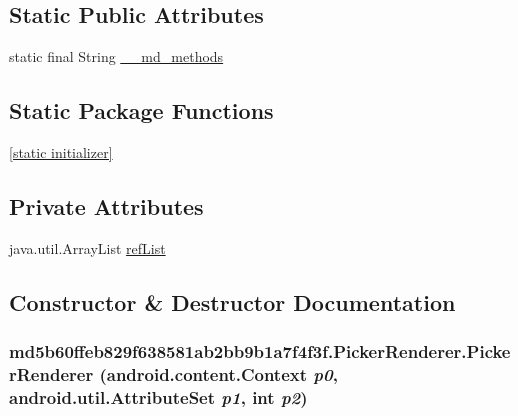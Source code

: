 \subsection*{Static Public Attributes}
\begin{CompactItemize}
\item 
static final String \hyperlink{classmd5b60ffeb829f638581ab2bb9b1a7f4f3f_1_1_picker_renderer_8a968a337192314e31ec4d605077182c}{\_\-\_\-md\_\-methods}
\end{CompactItemize}
\subsection*{Static Package Functions}
\begin{CompactItemize}
\item 
\hyperlink{classmd5b60ffeb829f638581ab2bb9b1a7f4f3f_1_1_picker_renderer_2225d8c4d5ee2120239beb2993665437}{\mbox{[}static initializer\mbox{]}}
\end{CompactItemize}
\subsection*{Private Attributes}
\begin{CompactItemize}
\item 
java.util.ArrayList \hyperlink{classmd5b60ffeb829f638581ab2bb9b1a7f4f3f_1_1_picker_renderer_7de5daff58c215b987daa2f1c47cdee5}{refList}
\end{CompactItemize}


\subsection{Constructor \& Destructor Documentation}
\hypertarget{classmd5b60ffeb829f638581ab2bb9b1a7f4f3f_1_1_picker_renderer_461011fae58fd61c16bddd9354a0e2ee}{
\subsubsection[{PickerRenderer}]{\setlength{\rightskip}{0pt plus 5cm}md5b60ffeb829f638581ab2bb9b1a7f4f3f.PickerRenderer.PickerRenderer (android.content.Context {\em p0}, \/  android.util.AttributeSet {\em p1}, \/  int {\em p2})}}
\label{classmd5b60ffeb829f638581ab2bb9b1a7f4f3f_1_1_picker_renderer_461011fae58fd61c16bddd9354a0e2ee}


